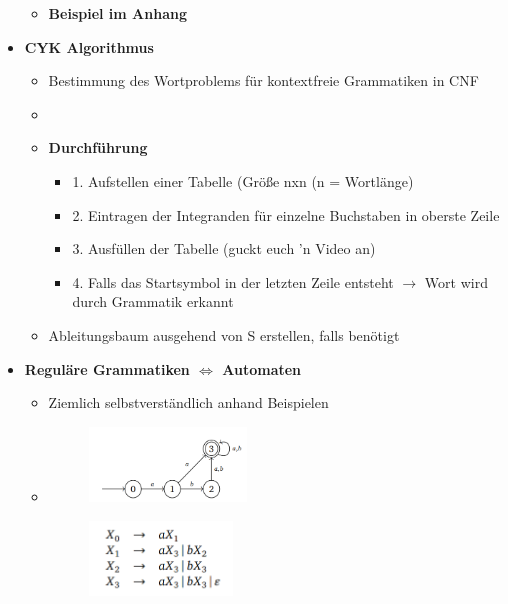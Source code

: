 \documentclass[11pt,a4paper]{article}
\begin{document}
\begin{itemize}
\begin{itemize}
	\item \textbf{Beispiel im Anhang}
	\end{itemize}


\item {\large \textbf{CYK Algorithmus}}
	\begin{itemize}
	\item Bestimmung des Wortproblems für kontextfreie Grammatiken in CNF
	\item[]
	\item \textbf{Durchführung}
		\begin{itemize}
		\item 1. Aufstellen einer Tabelle (Größe nxn (n = Wortlänge)
		\item 2. Eintragen der Integranden für einzelne Buchstaben in oberste Zeile
		\item 3. Ausfüllen der Tabelle (guckt euch 'n Video an)
		\item 4. Falls das Startsymbol in der letzten Zeile entsteht $\rightarrow$ Wort wird durch Grammatik erkannt
		\end{itemize}
	\item Ableitungsbaum ausgehend von S erstellen, falls benötigt
	\end{itemize}


\item {\large \textbf{Reguläre Grammatiken $\Leftrightarrow$ Automaten}}
	\begin{itemize}
	\item Ziemlich selbstverständlich anhand Beispielen
	\item[]
				\begin{minipage}{0.4\textwidth}
					\begin{figure}[H]
					\includegraphics[height=2cm]{reggra1}
					\end{figure}
				\end{minipage}
				\begin{minipage}[t]{0.4\textwidth}
					\vspace{-1cm}
					\begin{figure}[H]
					\includegraphics[height=2cm]{reggra2}
					\end{figure}
				\end{minipage}
	

\end{itemize}
\end{itemize}
\end{document}
